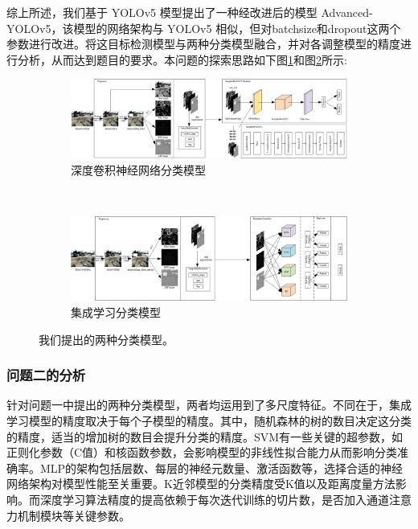 \documentclass[a4paper, 10pt]{article}
\begin{document}
	综上所述，我们基于 YOLOv5 模型提出了一种经改进后的模型 Advanced-YOLOv5，该模型的网络架构与 YOLOv5 相似，但对batchsize和dropout这两个参数进行改进。将这目标检测模型与两种分类模型融合，并对各调整模型的精度进行分析，从而达到题目的要求。本问题的探索思路如下图\ref{fig: proposed method1}和图\ref{fig: proposed method2}所示:
	
	\begin{figure}[htbp] 
		\centering 
		
		\begin{subfigure}{\textwidth}
			\includegraphics[width=\linewidth]{picture/proposed method1}
			\caption{深度卷积神经网络分类模型}
			\label{fig: proposed method1}	
		\end{subfigure} \\
		\begin{subfigure}{\textwidth}
			\includegraphics[width=\linewidth]{picture/proposed method2}
			\caption{集成学习分类模型}
			\label{fig: proposed method2}
		\end{subfigure}	
		\caption{
			\label{fig: Our proposed method}
			我们提出的两种分类模型。
		}
	\end{figure}
	
	
	\subsubsection{问题二的分析}
	
	针对问题一中提出的两种分类模型，两者均运用到了多尺度特征。不同在于，集成学习模型的精度取决于每个子模型的精度。其中，随机森林的树的数目决定这分类的精度，适当的增加树的数目会提升分类的精度。SVM有一些关键的超参数，如正则化参数（C值）和核函数参数，会影响模型的非线性拟合能力从而影响分类准确率。MLP的架构包括层数、每层的神经元数量、激活函数等，选择合适的神经网络架构对模型性能至关重要。K近邻模型的分类精度受K值以及距离度量方法影响。而深度学习算法精度的提高依赖于每次迭代训练的切片数，是否加入通道注意力机制模块等关键参数。	
	
\end{document}

